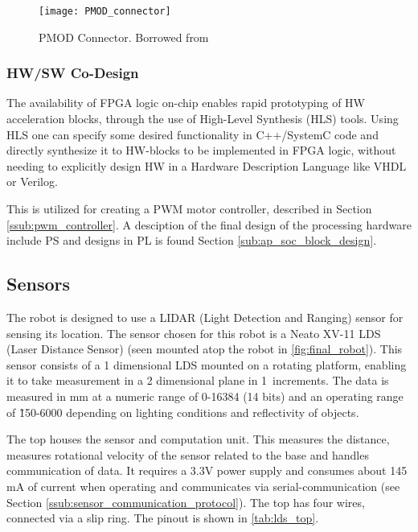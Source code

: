 \documentclass[Main]{subfiles}
\begin{document}
		\begin{figure}[H]
			\centering
			\texttt{[image: PMOD\_connector]}
			\caption{PMOD Connector. Borrowed from \cite{Digilent2014}}
			\label{fig:pmod}
		\end{figure}

		\subsubsection{HW/SW Co-Design} %
		\label{ssub:hw_sw_co_design}

			The availability of FPGA logic on-chip enables rapid prototyping of HW acceleration blocks, through the use of High-Level Synthesis (HLS) tools.
			Using HLS one can specify some desired functionality in C++/SystemC code and directly synthesize it to HW-blocks to be implemented in FPGA logic, without needing to explicitly design HW in a Hardware Description Language like VHDL or Verilog.

			This is utilized for creating a PWM motor controller, described in Section \ref{ssub:pwm_controller}.
			A desciption of the final design of the processing hardware include PS and designs in PL is found Section \ref{sub:ap_soc_block_design}.
			
	

	\subsection{Sensors} %
	\label{sub:sensor}

		The robot is designed to use a LIDAR (Light Detection and Ranging) sensor for sensing its location.
		The sensor chosen for this robot is a Neato XV-11 LDS (Laser Distance Sensor) (seen mounted atop the robot in \autoref{fig:final_robot}).
		This sensor consists of a 1 dimensional LDS mounted on a rotating platform, enabling it to take measurement in a 2 dimensional plane in 1\degree\ increments.
		The data is measured in mm at a numeric range of 0-16384 (14 bits) and an operating range of \~150-6000 depending on lighting conditions and reflectivity of objects.

		The top houses the sensor and computation unit. This measures the distance, measures rotational velocity of the sensor related to the base and handles communication of data.
		It requires a 3.3V power supply and consumes about 145 mA of current when operating and communicates via serial-communication (see Section \ref{ssub:sensor_communication_protocol}).
		The top has four wires, connected via a slip ring. 
		The pinout is shown in \autoref{tab:lds_top}.
\end{document}
